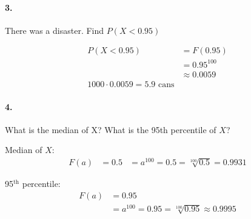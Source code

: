     \pagebreak

    \paragraph*{3.}
    There was a disaster. Find $P(X < 0.95)$
    \\
    \begin{mdframed}
        \begin{align*}
            P(X < 0.95) & = F(0.95)                 \\
                        & = 0.95^{100}              \\
                        & \approx \boxed{0.0059}    \\
            1000 \cdot 0.0059 = \boxed{5.9 \text{ cans}}
        \end{align*}
    \end{mdframed}

    \paragraph*{4.}
    What is the median of X? What is the 95th percentile of $X$?
    \\
    \begin{mdframed}
        Median of $X$:
        \begin{align*}
            F(a)& = 0.5
                & = a^{100} = 0.5 = \sqrt[100]{0.5} = \boxed{0.9931}
        \end{align*}

        95$^{\text{th}}$ percentile:
        \begin{align*}
            F(a)    & = 0.95                                  \\
                    & = a^{100} = 0.95 = \sqrt[100]{0.95} \approx \boxed{0.9995}
        \end{align*}
    \end{mdframed}
